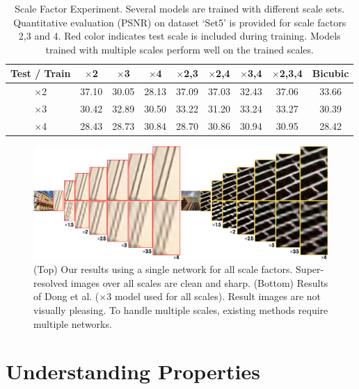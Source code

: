 \documentclass[10pt,twocolumn,letterpaper]{article}
\begin{document}
\begin{table}[t]
	\small
	\centering
\begin{tabular}
{|c|c|c|c|c|c|c|c||c|}
\hline 
 Test / Train & {$\times$2}& {$\times$3}& { $\times$4}& {$\times$2,3}& {$\times$2,4}& { $\times$3,4}& {$\times$2,3,4} & {Bicubic} \\
\hline
$\times$2  & \color{red} 37.10  & 30.05  & 28.13  & \color{red} 37.09  & \color{red} 37.03  & 32.43  & \color{red}37.06 &33.66   \\
$\times$3  & 30.42  & \color{red} 32.89  & 30.50  & \color{red} 33.22  & 31.20  & \color{red} 33.24  & \color{red} 33.27  & 30.39 \\
$\times$4  & 28.43  & 28.73  & \color{red} 30.84  & 28.70  & \color{red} 30.86  & \color{red} 30.94  & \color{red} 30.95 & 28.42  \\
\hline
\end{tabular}
	\vspace{1pt}
	\caption{Scale Factor Experiment. Several models are trained with different scale sets. Quantitative evaluation (PSNR) on dataset `Set5' is provided for scale factors 2,3 and 4.  {\color{red}Red color} indicates test scale is included during training. Models trained with multiple scales perform well on the trained scales. }
	\label{tab:SRCNN_Factor_Test}
\end{table}


\begin{figure}
\includegraphics[width=\textwidth]{figs/fig1_sffsr.pdf}
\caption{(Top) Our results using a single network for all scale factors. Super-resolved images over all scales are clean and sharp. (Bottom)  Results of Dong et al.  \cite{Dong2014} ($\times$3 model used for all scales). Result images are not visually pleasing. To handle multiple scales, existing methods require multiple networks.}
\end{figure}




\section{Understanding Properties}
\end{document}
